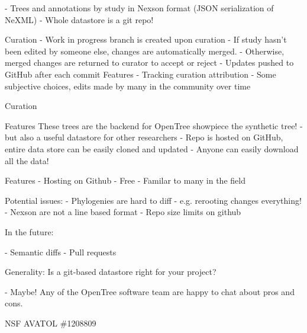 \documentclass[a4paper,10pt]{article}
\begin{document}
 - Trees and annotations by study in Nexson format  
(JSON serialization of NeXML)
 - Whole datastore is a git repo!  
 

 Curation
- Work in progress branch is created upon curation  
- If study hasn't been edited by someone else, changes are automatically merged.  
- Otherwise, merged changes are returned to curator to accept or reject
- Updates pushed to GitHub after each commit
 Features
 - Tracking curation attribution  
- Some subjective choices, edits made by many in the community over time

 Curation

 Features
 These trees are the backend for OpenTree showpiece  
 the synthetic tree!
 - but also a useful datastore for other researchers
 - Repo is hosted on GitHub, entire data store can be easily cloned and updated
 - Anyone can easily download all the data!
 
 Features
- Hosting on Github
- Free  
- Familar to  many in the field


 Potential issues:
 - Phylogenies are hard to diff - e.g. rerooting changes everything!
 - Nexson are not a line based format
 - Repo size limits on github


 In the future:

 - Semantic diffs  
 - Pull requests
 
  
Generality:
Is a git-based datastore right for your project?

 - Maybe! Any of the OpenTree software team are happy to chat about pros and cons.

NSF AVATOL \#1208809  
\end{document}
